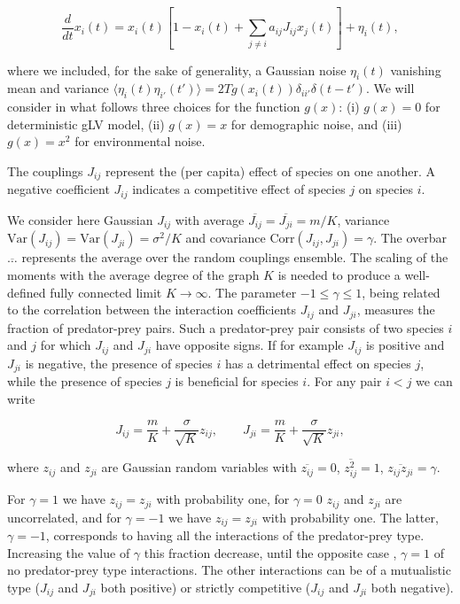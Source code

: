 \documentclass[
    preprint,
    linenumbers,
    amsmath,amssymb,amsfonts,
    aps, physrev,
    superscriptaddress,
    10pt,
    bibnotes
    ]{revtex4-2}
\begin{document}
\begin{equation}
\frac{d}{dt}x_{i}(t)=x_{i}(t)\left[1-x_{i}(t)+\sum_{j\neq i}a_{ij}J_{ij}x_{j}(t)\right]+\eta_{i}(t),\label{eq:Lotka-Volterra_eq}
\end{equation}

where we included, for the sake of generality, a Gaussian noise $\eta_{i}(t)$ vanishing mean and variance $\langle\eta_{i}(t)\eta_{i'}(t')\rangle=2Tg(x_i(t))\delta_{ii'}\delta(t-t')$. We will consider in what follows three choices for the function $g(x)$: (i) $g(x)=0$ for deterministic gLV model, (ii) $g(x)=x$ for demographic noise, and (iii) $g(x)=x^2$ for environmental noise.

The couplings $J_{ij}$ represent the (per capita) effect of species
on one another. A negative coefficient $J_{ij}$ indicates a competitive
effect of species $j$ on species $i$.

We consider here Gaussian $J_{ij}$ with average $\overline{J_{ij}}=\overline{J_{ji}}=m/K$,
variance $\text{Var}(J_{ij})=\text{Var}(J_{ji})=\sigma^{2}/K$ and
covariance $\text{Corr}(J_{ij},J_{ji})=\gamma$. The overbar $\overline{\dots}$
represents the average over the random couplings ensemble. The scaling
of the moments with the average degree of the graph $K$ is needed
to produce a well-defined fully connected limit $K\to\infty$. The
parameter $-1\leq\gamma\leq1$, being related to the correlation between
the interaction coefficients $J_{ij}$ and $J_{ji}$, measures the
fraction of predator-prey pairs. Such a predator-prey pair consists
of two species $i$ and $j$ for which $J_{ij}$ and $J_{ji}$ have
opposite signs. If for example $J_{ij}$ is positive and $J_{ji}$
is negative, the presence of species $i$ has a detrimental effect
on species $j$, while the presence of species $j$ is beneficial
for species $i$. For any pair $i<j$ we can write

\begin{equation}
J_{ij}=\frac{m}{K}+\frac{\sigma}{\sqrt{K}}z_{ij},\qquad J_{ji}=\frac{m}{K}+\frac{\sigma}{\sqrt{K}}z_{ji},
\end{equation}

where $z_{ij}$ and $z_{ji}$ are Gaussian random variables with $\overline{z_{ij}}=0$,
$\overline{z_{ij}^{2}}=1$, $\overline{z_{ij}z_{ji}}=\gamma$.

For $\gamma=1$ we have $z_{ij}=z_{ji}$ with probability one, for
$\gamma=0$ $z_{ij}$ and $z_{ji}$ are uncorrelated, and for $\gamma=-1$
we have $z_{ij}=z_{ji}$ with probability one. The latter, $\gamma=-1$,
corresponds to having all the interactions of the predator-prey type.
Increasing the value of $\gamma$ this fraction decrease, until the
opposite case , $\gamma=1$ of no predator-prey type interactions.
The other interactions can be of a mutualistic type ($J_{ij}$ and
$J_{ji}$ both positive) or strictly competitive ($J_{ij}$ and $J_{ji}$
both negative).
\end{document}
